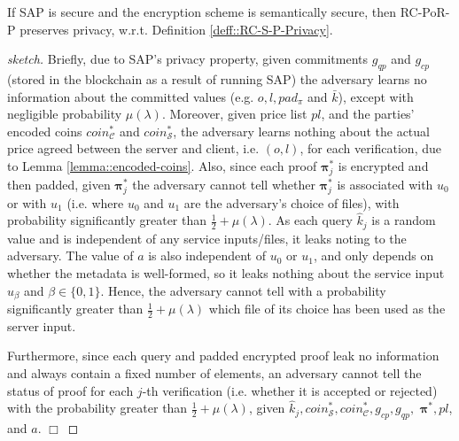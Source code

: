 \begin{lemma} If SAP is secure and the encryption scheme is semantically secure, then RC-PoR-P preserves privacy, w.r.t. Definition \ref{deff::RC-S-P-Privacy}. 
\end{lemma}

\begin{proof}[sketch] Briefly, due to SAP's privacy property, given  commitments $g_{\scriptscriptstyle qp}$ and $g_{\scriptscriptstyle cp}$ (stored in the blockchain as a result of running SAP) the adversary learns no information about the committed values (e.g. $o, l, pad_{\scriptscriptstyle\pi}$ and $\bar{k}$), except with negligible probability $\mu(\lambda)$. Moreover, given  price list $pl$, and the parties' encoded coins $coin^{\scriptscriptstyle *}_{\scriptscriptstyle\mathcal{C}}$ and  $coin^{\scriptscriptstyle *}_{\scriptscriptstyle\mathcal{S}}$, the adversary learns nothing about the actual price agreed between the server and client, i.e. $(o,l)$, for each verification, due to Lemma \ref{lemma::encoded-coins}.  Also, since each proof $\bm{\pi}^{\scriptscriptstyle *}_{\scriptscriptstyle j}$ is encrypted and then padded, given $\bm{\pi}^{\scriptscriptstyle *}_{\scriptscriptstyle j}$ the adversary cannot tell  whether $\bm{\pi}^{\scriptscriptstyle *}_{\scriptscriptstyle j}$ is associated with $u_{\scriptscriptstyle 0}$ or with $u_{\scriptscriptstyle 1}$ (i.e. where $u_{\scriptscriptstyle 0}$ and $u_{\scriptscriptstyle 1}$ are the adversary's choice of files), with probability significantly greater than $\frac{1}{2}+\mu(\lambda)$. As each query $\hat{k}_{\scriptscriptstyle j}$ is a random value and is  independent of any service inputs/files, it leaks noting to the adversary.  The value of $a$ is also independent of $u_{\scriptscriptstyle 0}$  or $u_{\scriptscriptstyle 1}$, and only depends on whether the metadata is well-formed, so it leaks nothing about the service input $u_{\scriptscriptstyle\beta}$ and $\beta\in\{0,1\}$. Hence, the adversary cannot tell with a probability significantly greater than $\frac{1}{2}+\mu(\lambda)$ which file of its choice has been used as the server input. 

Furthermore, since each query and padded encrypted proof leak no information and always contain a fixed number of elements, an adversary cannot tell the status of  proof for each $j$-th verification (i.e. whether it is accepted or rejected) with the probability greater than $\frac{1}{2}+\mu(\lambda)$, given  $\hat{k}_{\scriptscriptstyle j},coin^{\scriptscriptstyle *}_{\scriptscriptstyle \mathcal S},coin^{\scriptscriptstyle *}_{\scriptscriptstyle\mathcal C}, g_{\scriptscriptstyle cp},  g_{\scriptscriptstyle qp},$  $\bm{\pi}^{\scriptscriptstyle *},pl$, and $a$.
  \hfill\(\Box\)\end{proof}


